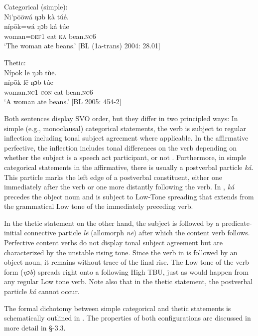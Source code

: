 \documentclass[output=paper]{langsci/langscibook}
\begin{document}
\ea
 Categorical (simple):  \\
\glll Ni\'{ }p\={o}\={o}wá  ŋɔb  kà  túé.\\
    \textup{níp\={o}k=wá  }\textup{ŋɔb  k}\textup{á}\textup{  túe}\\
     woman=\textsc{def}1  eat  \textsc{ka}  bean.\textsc{nc}6\\
\glt ‘The woman ate beans.’ [BL (1a-trans) 2004: 28.01]
\z

\ea
 Thetic:\\
\glll Níp\={o}k    l\={e}  ŋɔb  tù\={e}.\\
     \textup{níp\={o}k    l\={e}  }\textup{ŋɔb  túe}\\
     woman.\textsc{nc}1  \textsc{con}  eat  bean.\textsc{nc}6\\
\glt ‘A woman ate beans.’ [BL  2005: 454-2]
\z

Both sentences display SVO order, but they differ in two principled ways: In simple (e.g., monoclausal) categorical statements, the verb is subject to regular inflection including tonal subject agreement where applicable. In the affirmative perfective, the inflection includes tonal differences on the verb depending on whether the subject is a speech act participant, or not \citep{Schwarz2007}. Furthermore, in simple categorical statements in the affirmative, there is usually a postverbal particle \textit{ká. }This particle marks the left edge of a postverbal constituent, either one immediately after the verb or one more distantly following the verb. In , \textit{ká }precedes the object noun and is subject to Low-Tone spreading that extends from the grammatical Low tone of the immediately preceding verb.

In the thetic statement on the other hand, the subject is followed by a predicate-initial connective particle \textit{l}\textit{\={e}}\textit{ }(allomorph \textit{n\={e}}) after which the content verb follows. Perfective content verbs do not display tonal subject agreement but are characterized by the unstable rising tone. Since the verb in  is followed by an object noun, it remains without trace of the final rise. The Low tone of the verb form (\textit{ŋɔb}) spreads right onto a following High TBU, just as would happen from any regular Low tone verb. Note also that in the thetic statement, the postverbal particle \textit{ká }cannot occur.

  The formal dichotomy between simple categorical and thetic statements is schematically outlined in . The properties of both configurations are discussed in more detail in §-3.3.
 
\end{document}
